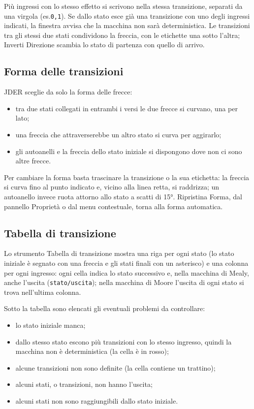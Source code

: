 \documentclass[a4paper,11pt]{article}
\newcommand\mediumweight{\fontseries{mb}\selectfont}
\newcommand\uielement[1]{{\mediumweight #1}}
\newcommand\jder{{\mediumweight JDER}}
\begin{document}
Più ingressi con lo stesso effetto si scrivono nella stessa transizione, separati da una virgola
(es.\@ \texttt{0,1}). Se dallo stato esce già una transizione con uno degli ingressi indicati, la
finestra avvisa che la macchina non sarà deterministica. Le transizioni tra gli stessi due stati
condividono la freccia, con le etichette una sotto l'altra; \uielement{Inverti Direzione} scambia
lo stato di partenza con quello di arrivo.

\subsection{Forma delle transizioni}

\jder{} sceglie da solo la forma delle frecce:
\begin{itemize}
  \item tra due stati collegati in entrambi i versi le due frecce si curvano, una per lato;
  \item una freccia che attraverserebbe un altro stato si curva per aggirarlo;
  \item gli autoanelli e la freccia dello stato iniziale si dispongono dove non ci sono altre frecce.
\end{itemize}

Per cambiare la forma basta trascinare la transizione o la sua etichetta: la freccia si curva fino
al punto indicato e, vicino alla linea retta, si raddrizza; un autoanello invece ruota attorno allo
stato a scatti di 15°. \uielement{Ripristina Forma}, dal pannello Proprietà o dal menu contestuale,
torna alla forma automatica.

\subsection{Tabella di transizione}

Lo strumento \uielement{Tabella di transizione} mostra una riga per ogni stato (lo stato iniziale è
segnato con una freccia e gli stati finali con un asterisco) e una colonna per ogni ingresso: ogni
cella indica lo stato successivo e,
nella macchina di Mealy, anche l'uscita (\texttt{stato/uscita}); nella macchina di Moore l'uscita
di ogni stato si trova nell'ultima colonna.

Sotto la tabella sono elencati gli eventuali problemi da controllare:
\begin{itemize}
  \item lo stato iniziale manca;
  \item dallo stesso stato escono più transizioni con lo stesso ingresso, quindi la macchina non è
        deterministica (la cella è in rosso);
  \item alcune transizioni non sono definite (la cella contiene un trattino);
  \item alcuni stati, o transizioni, non hanno l'uscita;
  \item alcuni stati non sono raggiungibili dallo stato iniziale.
\end{itemize}
\end{document}
